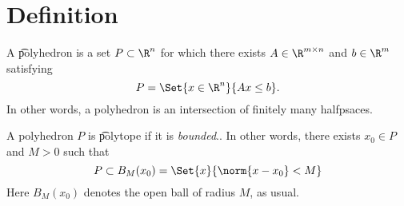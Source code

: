 
\section*{Definition}

A \t{polyhedron} is a set $P \subset \R ^n$ for which there exists $A \in \R ^{m \times  n}$ and $b \in \R ^{m}$ satisfying
\[
P = \Set{x \in \R ^n}{Ax \leq b}.
\]
In other words, a polyhedron is an intersection of finitely many halfpsaces.

A polyhedron $P$ is \t{polytope} if it is \textit{bounded}..
In other words, there exists $x_0 \in P$ and $M > 0$ such that
\[
P \subset B_M(x_0) = \Set{x }{\norm{x - x_0} < M}
\]
Here $B_M(x_0)$ denotes the open ball of radius $M$, as usual.


\blankpage